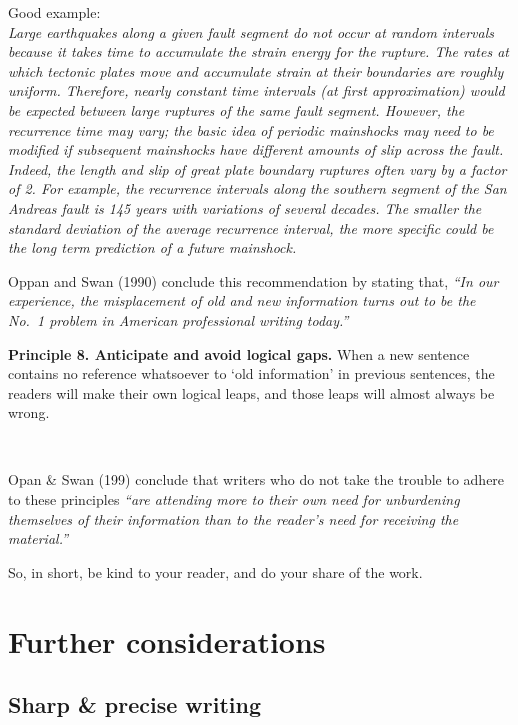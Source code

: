 \documentclass[
]{book}
\begin{document}
Good example:\\
\emph{Large earthquakes along a given fault segment do not occur at random intervals because it takes time to accumulate the strain energy for the rupture. The rates at which tectonic plates move and accumulate strain at their boundaries are roughly uniform. Therefore, nearly constant time intervals (at first approximation) would be expected between large ruptures of the same fault segment. However, the recurrence time may vary; the basic idea of periodic mainshocks may need to be modified if subsequent mainshocks have different amounts of slip across the fault. Indeed, the length and slip of great plate boundary ruptures often vary by a factor of 2. For example, the recurrence intervals along the southern segment of the San Andreas fault is 145 years with variations of several decades. The smaller the standard deviation of the average recurrence interval, the more specific could be the long term prediction of a future mainshock.}

Oppan and Swan (1990) conclude this recommendation by stating that, \emph{``In our experience, the misplacement of old and new information turns out to be the No.~1 problem in American professional writing today.''}

\textbf{Principle 8. Anticipate and avoid logical gaps.} When a new sentence contains no reference whatsoever to `old information' in previous sentences, the readers will make their own logical leaps, and those leaps will almost always be wrong.

~

Opan \& Swan (199) conclude that writers who do not take the trouble to adhere to these principles \emph{``are attending more to their own need for unburdening themselves of their information than to the reader's need for receiving the material.''}

So, in short, be kind to your reader, and do your share of the work.

\hypertarget{further-considerations}{%
\section*{Further considerations}\label{further-considerations}}

\hypertarget{sharp-precise-writing}{%
\subsection*{Sharp \& precise writing}\label{sharp-precise-writing}}
\end{document}
